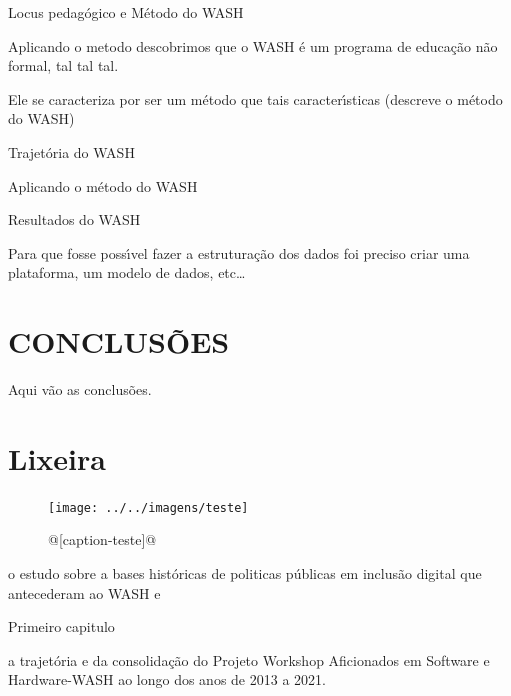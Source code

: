 \documentclass[
12pt,		%
openright,	%
twoside,  %
a4paper,			%
chapter=TITLE,		%
english,			%
french,				%
spanish,			%
brazil				%
]{USPSC-classe/USPSC}
\begin{document}
Locus pedag\'ogico e M\'etodo do WASH




 Aplicando o metodo descobrimos que o WASH \'e um programa de educa\c{c}\~ao n\~ao formal, tal tal tal.




Ele se caracteriza por ser um m\'etodo que tais caracter\'{\i}sticas (descreve o m\'etodo do WASH)




Trajet\'oria do WASH




Aplicando o m\'etodo do WASH




Resultados do WASH




Para que fosse poss\'{\i}vel fazer a estrutura\c{c}\~ao dos dados foi preciso criar uma plataforma, um modelo de dados, etc…




\chapter[CONCLUS\~OES]{CONCLUS\~OES}\label{CONCLUS\~OES}
Aqui v\~ao as conclus\~oes.




\chapter[Lixeira]{Lixeira}\label{Lixeira}


\begin{figure}[htb]

	\begin{center}

		\texttt{[image: ../../imagens/teste]}

	\end{center}

	\caption{\label{teste}@[caption-teste]@}


\end{figure}
o estudo sobre a  bases hist\'oricas de politicas p\'ublicas em inclus\~ao digital que antecederam ao WASH e




Primeiro capitulo




a trajet\'oria e da consolida\c{c}\~ao do Projeto Workshop Aficionados em Software e Hardware-WASH ao longo dos anos de 2013 a 2021.
\end{document}
